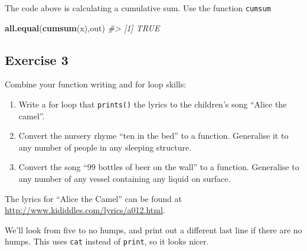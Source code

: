 \documentclass[]{book}
\newenvironment{Shaded}{\begin{snugshade}}{\end{snugshade}}
\newcommand{\CommentTok}[1]{\textcolor[rgb]{0.56,0.35,0.01}{\textit{#1}}}
\newcommand{\KeywordTok}[1]{\textcolor[rgb]{0.13,0.29,0.53}{\textbf{#1}}}
\newcommand{\NormalTok}[1]{#1}
\providecommand{\tightlist}{%
  \setlength{\itemsep}{0pt}\setlength{\parskip}{0pt}}
\theoremstyle{definition}
\theoremstyle{definition}
\theoremstyle{definition}
\theoremstyle{remark}
\begin{document}
The code above is calculating a cumulative sum. Use the function
\texttt{cumsum}

\begin{Shaded}
\begin{Highlighting}[]
\KeywordTok{all.equal}\NormalTok{(}\KeywordTok{cumsum}\NormalTok{(x),out)}
\CommentTok{#> [1] TRUE}
\end{Highlighting}
\end{Shaded}

\hypertarget{exercise-3-38}{%
\subsection{Exercise 3}\label{exercise-3-38}}

Combine your function writing and for loop skills:

\begin{enumerate}
\def\labelenumi{\arabic{enumi}.}
\tightlist
\item
  Write a for loop that \texttt{prints()} the lyrics to the children's
  song ``Alice the camel''.
\item
  Convert the nursery rhyme ``ten in the bed'' to a function. Generalise
  it to any number of people in any sleeping structure.
\item
  Convert the song ``99 bottles of beer on the wall'' to a function.
  Generalise to any number of any vessel containing any liquid on
  surface.
\end{enumerate}

The lyrics for ``Alice the Camel'' can be found at
\url{http://www.kididdles.com/lyrics/a012.html}.

We'll look from five to no humps, and print out a different last line if
there are no humps. This uses \texttt{cat} instead of \texttt{print}, so
it looks nicer.
\end{document}
